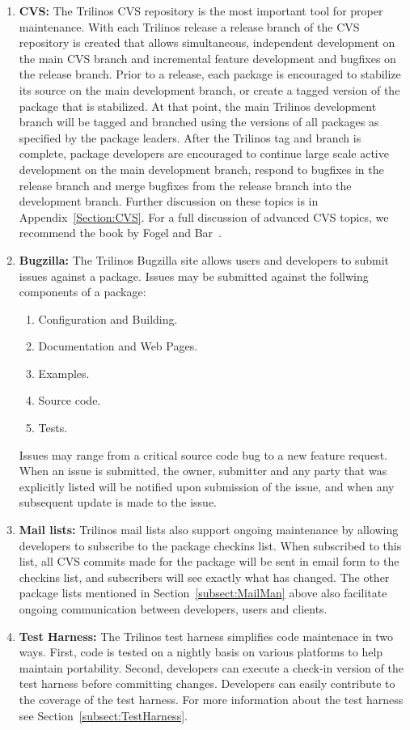 \documentclass[12pt,strict]{TrilinosDevGuide}
\begin{document}
\begin{enumerate}
\item {\bf CVS:} The Trilinos CVS repository is the most important
tool for proper maintenance.  With each Trilinos release a release
branch of the CVS repository is
created  that allows simultaneous, independent development on the main
CVS branch and incremental feature development and
bugfixes on the release branch.  Prior to a release, each package is
encouraged to stabilize its source on the main development branch, or
create a tagged version of the package that is stabilized.  At that
point, the main Trilinos development branch will be tagged and
branched using the versions of all packages as specified by the
package leaders.  After the Trilinos tag and branch is complete, 
package developers are encouraged to continue large scale active
development on the main development branch, respond to bugfixes in the
release branch and merge bugfixes from the release branch into the
development branch.  Further discussion on these topics is in 
Appendix~\ref{Section:CVS}.  For a full discussion of advanced CVS
topics, we recommend the book by Fogel and Bar~\cite{FogelBarCVS}.

\item {\bf Bugzilla:} The Trilinos Bugzilla site
allows users and developers to submit issues against a package.
Issues may be submitted against the follwing components of a package:
\begin{enumerate}
\item Configuration and Building.
\item Documentation and Web Pages.
\item Examples.
\item Source code.
\item Tests.
\end{enumerate}
Issues may range from a critical source code bug to a new feature
request.  When an issue is submitted, the owner, submitter and any
party that was explicitly listed will be notified upon submission of
the issue, and when any subsequent update is made to the issue.

\item {\bf Mail lists:} 
Trilinos mail lists also support ongoing maintenance by allowing
developers to subscribe to the package checkins list.  When subscribed
to this list, all CVS commits made for the package will be sent in
email form to the checkins list, and subscribers will see exactly what
has changed. The other package lists mentioned in 
Section~\ref{subsect:MailMan} above also facilitate ongoing
communication between developers, users and clients.

\item {\bf Test Harness:} 
The Trilinos test harness simplifies code maintenace in two ways.  First, code 
is tested on a nightly basis on various platforms to help maintain portability.
Second, developers can execute a check-in version of the test harness before 
committing changes.  Developers can easily contribute to the coverage of the 
test harness.  For more information about the test harness see 
Section~\ref{subsect:TestHarness}.
\end{enumerate}
\end{document}
